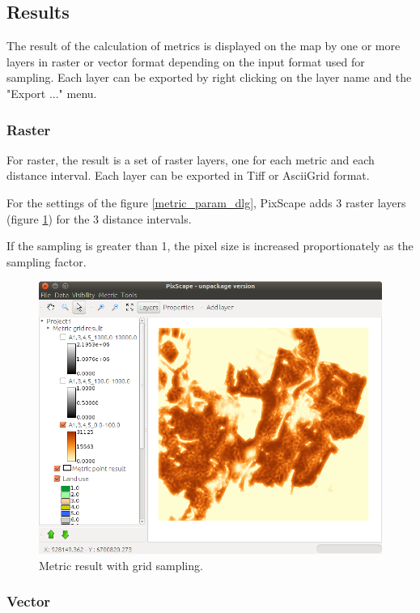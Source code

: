 \documentclass{report}
\begin{document}
\subsection{Results}

The result of the calculation of metrics is displayed on the map by one or more layers in raster or vector format depending on the input format used for sampling. Each layer can be exported by right clicking on the layer name and the "Export ..." menu.

\subsubsection{Raster}
For raster, the result is a set of raster layers, one for each metric and each distance interval. Each layer can be exported in Tiff or AsciiGrid format.

For the settings of the figure \ref{metric_param_dlg}, PixScape adds 3 raster layers (figure \ref{metric_result_rast}) for the 3 distance intervals.

If the sampling is greater than 1, the pixel size is increased proportionately as the sampling factor. 

\begin{figure}[H]
	\includegraphics[scale=0.5]{img/metric_result_rast-en.png} 
	\caption{Metric result with grid sampling.}
	\label{metric_result_rast}
\end{figure}

\subsubsection{Vector}
\end{document}
